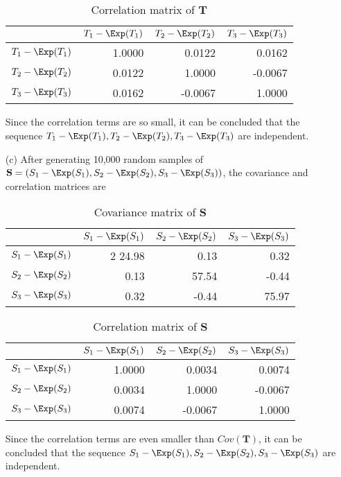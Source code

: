 \documentclass[11pt,a4paper]{article}
\begin{document}
\begin{enumerate}
\begin{table}[H]
\centering
\begin{tabular}{rrrr}
\hline
& $T_1 - \Exp(T_1)$ & $T_2 - \Exp(T_2)$ & $T_3 - \Exp(T_3)$ \\ 
\hline
  $T_1 - \Exp(T_1)$ & 1.0000 & 0.0122 & 0.0162 \\ 
  $T_2 - \Exp(T_2)$ & 0.0122 & 1.0000 & -0.0067 \\ 
  $T_3 - \Exp(T_3)$ & 0.0162 & -0.0067 & 1.0000 \\ 
\hline
\end{tabular}
\caption{Correlation matrix of $\mathbf{T}$}
\end{table}
Since the correlation terms are so small, it can be concluded that the sequence $T_1 - \Exp(T_1), T_2 - \Exp(T_2), T_3 - \Exp(T_3)$ are independent.

\item[(c)] After generating 10,000 random samples of $\mathbf{S} = (S_1 - \Exp(S_1), S_2 - \Exp(S_2), S_3 - \Exp(S_3))$, the covariance and correlation matrices are
\begin{table}[H]
\centering
\begin{tabular}{rrrr}
  \hline
& $S_1 - \Exp(S_1)$ & $S_2 - \Exp(S_2)$ & $S_3 - \Exp(S_3)$ \\   \hline
  \hline
  $S_1 - \Exp(S_1)$ & 2 24.98 & 0.13 & 0.32 \\ 
  $S_2 - \Exp(S_2)$ & 0.13 & 57.54 & -0.44 \\ 
  $S_3 - \Exp(S_3)$ & 0.32 & -0.44 & 75.97 \\ 
  \hline
\end{tabular}
\caption{Covariance matrix of $\mathbf{S}$}
\end{table}
\begin{table}[H]
\centering
\begin{tabular}{rrrr}
  \hline
& $S_1 - \Exp(S_1)$ & $S_2 - \Exp(S_2)$ & $S_3 - \Exp(S_3)$ \\   \hline
  $S_1 - \Exp(S_1)$ & 1.0000 &  0.0034 & 0.0074 \\ 
  $S_2 - \Exp(S_2)$ & 0.0034 & 1.0000 & -0.0067 \\ 
  $S_3 - \Exp(S_3)$ & 0.0074 & -0.0067 & 1.0000 \\ 
   \hline
\end{tabular}
\caption{Correlation matrix of $\mathbf{S}$}
\end{table}
Since the correlation terms are even smaller than $Cov(\mathbf{T})$, it can be concluded that the sequence $S_1 - \Exp(S_1), S_2 - \Exp(S_2), S_3 - \Exp(S_3)$ are independent.


\end{enumerate}
\end{document}
